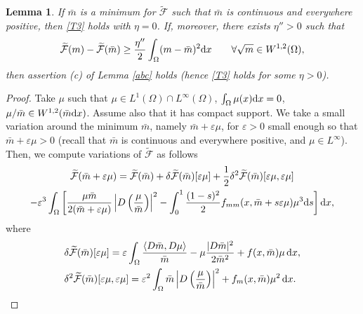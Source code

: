 \documentclass[10pt,a4paper,nouppercase,nowrite]{article}
\numberwithin{equation}{section}
\newcommand{\di}{{\rm d}}
\newcommand{\eps}{\varepsilon}
\newcommand{\F}{\widetilde{\mathcal{F}}}
\newtheorem{lem}[defn]{Lemma}
\theoremstyle{definition}
\begin{document}
\begin{lem}
	If $\bar{m}$ is a minimum for $\widetilde{\mathcal{F}}$ such that $\bar m$ is continuous and everywhere positive, then \eqref{T3} holds with $\eta = 0$. If, moreover, there exists $\eta'' > 0$ such that
	\begin{equation} 
		\widetilde{\mathcal{F}}(m) - \widetilde{\mathcal{F}}(\bar{m}) \geq \frac{\eta''}{2} \int_{\Omega} (m-\bar{m})^2 \di x \qquad \forall \sqrt m \in W^{1,2}(\Omega),
		\label{coerci}
	\end{equation}
	then assertion (c) of Lemma \ref{abc} holds (hence \eqref{T3} holds for some $\eta > 0$).
\end{lem}
\begin{proof}
	Take $\mu$ such that $\mu \in L^1(\Omega) \cap L^\infty(\Omega)$, $\int_{\Omega} \mu(x) \di x = 0$, $\mu/\bar m \in  W^{1,2}(\bar m \di x)$. Assume also that it has compact support. We take a small variation around the minimum $\bar{m}$, namely $\bar m + \eps \mu$, for $\eps > 0$ small enough so that $\bar m + \eps \mu > 0$ (recall that $\bar m$ is continuous and everywhere positive, and $\mu \in L^\infty$). Then, we compute variations of $\widetilde{\mathcal{F}}$ as follows
	\begin{multline*}
		\F(\bar m + \eps \mu) = \F(\bar m) + \delta\F(\bar m)[\eps \mu] + \frac12 \delta^2\F(\bar m)[\eps \mu, \eps \mu] \\
		-\eps^3 \int_{\Omega}\left[ \frac{\mu \bar m}{2(\bar m+ \eps \mu)} \left|D\left( \frac \mu{\bar m}\right) \right|^2 - \int_0^1 \frac{(1-s)^2}{2} f_{mm}(x, \bar m + s \eps \mu)\mu^3\di s \right] \di x,
	\end{multline*}
	where
	\begin{align*}
	&\delta\F(\bar m)[\eps \mu] = \eps \int_{\Omega} \frac{\langle D \bar m, D \mu \rangle}{\bar m} - \mu \frac{|D \bar m|^2}{2\bar m^2} + f(x,\bar m) \mu \, \di x, \\
	& \delta^2\F(\bar m)[\eps \mu, \eps \mu] = \eps^2 \int_{\Omega} \bar m \left|D\left( \frac \mu{\bar m}\right) \right|^2 + f_m(x,\bar m) \mu^2 \, \di x.
	\end{align*}
	

\end{proof}
\end{document}
